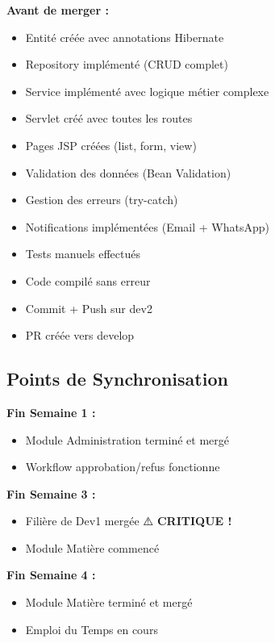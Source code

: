 \documentclass[11pt,a4paper]{article}
\begin{document}
\textbf{Avant de merger :}
\begin{itemize}
    \item[$\square$] Entité créée avec annotations Hibernate
    \item[$\square$] Repository implémenté (CRUD complet)
    \item[$\square$] Service implémenté avec logique métier complexe
    \item[$\square$] Servlet créé avec toutes les routes
    \item[$\square$] Pages JSP créées (list, form, view)
    \item[$\square$] Validation des données (Bean Validation)
    \item[$\square$] Gestion des erreurs (try-catch)
    \item[$\square$] Notifications implémentées (Email + WhatsApp)
    \item[$\square$] Tests manuels effectués
    \item[$\square$] Code compilé sans erreur
    \item[$\square$] Commit + Push sur dev2
    \item[$\square$] PR créée vers develop
\end{itemize}

\subsection{Points de Synchronisation}

\textbf{Fin Semaine 1 :}
\begin{itemize}
    \item[$\square$] Module Administration terminé et mergé
    \item[$\square$] Workflow approbation/refus fonctionne
\end{itemize}

\textbf{Fin Semaine 3 :}
\begin{itemize}
    \item[$\square$] Filière de Dev1 mergée ⚠️ \textbf{CRITIQUE !}
    \item[$\square$] Module Matière commencé
\end{itemize}

\textbf{Fin Semaine 4 :}
\begin{itemize}
    \item[$\square$] Module Matière terminé et mergé
    \item[$\square$] Emploi du Temps en cours
\end{itemize}
\end{document}
